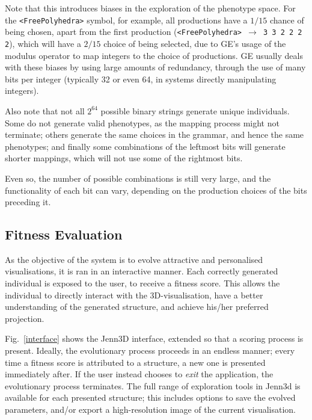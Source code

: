 \documentclass{article}
\begin{document}
Note that this introduces biases in the exploration of the phenotype space. For
the \texttt{<FreePolyhedra>} symbol, for example, all productions have a $1/15$
chance of being chosen, apart from the first production
(\texttt{<FreePolyhedra> $\rightarrow$ 3 3 2 2 2 2}), which will have a $2/15$
choice of being selected, due to GE's usage of the modulus operator to map
integers to the choice of productions.  GE usually deals with these biases by
using large amounts of redundancy, through the use of many bits per integer
(typically 32 or even 64, in systems directly manipulating integers).

Also note that not all $2^{64}$ possible binary strings generate unique
individuals. Some do not generate valid phenotypes, as the mapping process
might not terminate; others generate the same choices in the grammar, and hence
the same phenotypes; and finally some combinations of the leftmost bits will
generate shorter mappings, which will not use some of the rightmost bits.

Even so, the number of possible combinations is still very large, and the
functionality of each bit can vary, depending on the production choices of the
bits preceding it.

\subsection{Fitness Evaluation}

As the objective of the system is to evolve attractive and personalised
visualisations, it is ran in an interactive manner. Each correctly generated
individual is exposed to the user, to receive a fitness score. This allows the
individual to directly interact with the 3D-visualisation, have a better
understanding of the generated structure, and achieve his/her preferred
projection.

Fig.~\ref{interface} shows the Jenn3D interface, extended so that a scoring
process is present. Ideally, the evolutionary process proceeds in an endless
manner; every time a fitness score is attributed to a structure, a new one is
presented immediately after. If the user instead chooses to \textit{exit} the
application, the evolutionary process terminates. The full range of exploration
tools in Jenn3d is available for each presented structure; this includes
options to save the evolved parameters, and/or export a high-resolution image
of the current visualisation.
\end{document}
